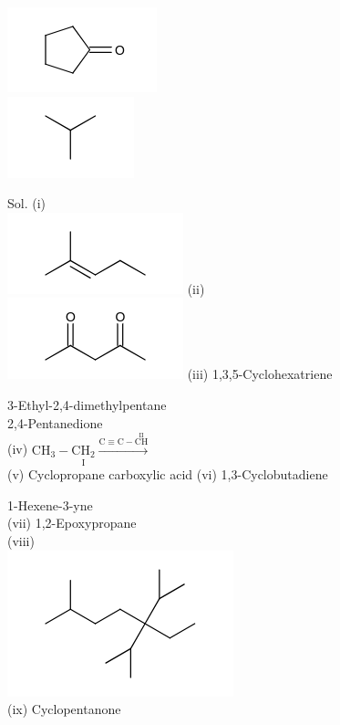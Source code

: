 \documentclass[10pt]{article}
\begin{document}
\includegraphics{smile-92a1d0503ef31d5435046d45cbc7302c65af0d0a}\\
\includegraphics{smile-cf485fb1c85e6228be599460aac530a7807574c8}

Sol. (i)\\
\includegraphics{smile-aaa53399dae130857e65d611082d0bbacf0e9952} (ii)\\
\includegraphics{smile-75f0444f43e6a54e77d34b65fb6281c300d533c3} (iii) 1,3,5-Cyclohexatriene

3-Ethyl-2,4-dimethylpentane\\
2,4-Pentanedione\\
(iv) $\mathrm{CH}_{3}-\underset{\text { I }}{\mathrm{CH}_{2}} \xrightarrow{\mathrm{C} \equiv \mathrm{C}-\stackrel{\text { II }}{\mathrm{CH}}}$\\
(v) Cyclopropane carboxylic acid (vi) 1,3-Cyclobutadiene

1-Hexene-3-yne\\
(vii) 1,2-Epoxypropane\\
(viii)\\
\includegraphics{smile-f5c7f3f648f77c1967cf59cc9f91c503e813bf54}\\
(ix) Cyclopentanone
\end{document}
